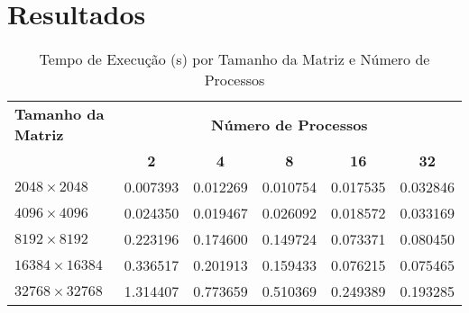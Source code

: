 \documentclass[a4paper, 12pt]{article}
\begin{document}
	\section{Resultados}
		\begin{table}[h!]
		\centering
		\label{tab:execution_times_simple}
		\begin{tabular}{|l|c|c|c|c|c|}
			\hline
			\textbf{Tamanho da Matriz} & \multicolumn{5}{c|}{\textbf{Número de Processos}} \\
			\cline{2-6}
			& \textbf{2} & \textbf{4} & \textbf{8} & \textbf{16} & \textbf{32} \\
			\hline
			$2048 \times 2048$        & 0.007393   & 0.012269   & 0.010754   & 0.017535    & 0.032846    \\ %
			\hline
			$4096 \times 4096$        & 0.024350   & 0.019467   & 0.026092   & 0.018572    & 0.033169    \\ %
			\hline
			$8192 \times 8192$        & 0.223196   & 0.174600   & 0.149724   & 0.073371    & 0.080450    \\ %
			\hline
			$16384 \times 16384$      & 0.336517   & 0.201913   & 0.159433   & 0.076215    & 0.075465    \\ %
			\hline
			$32768 \times 32768$      & 1.314407   & 0.773659   & 0.510369   & 0.249389    & 0.193285    \\ %
			\hline
		\end{tabular}
		\caption{Tempo de Execução (s) por Tamanho da Matriz e Número de Processos}
	\end{table}
	
\end{document}
